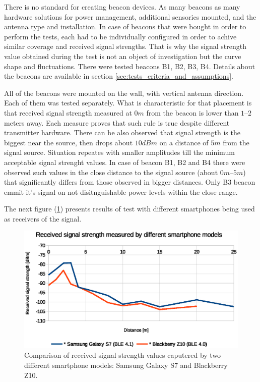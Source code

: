\documentclass[../main.tex]{subfiles}
\begin{document}
There is no standard for creating beacon devices. As many beacons as many hardware solutions for power management, additional sensorics mounted, and the antenna type and installation. In case of beacons that were bought in order to perform the tests, each had to be individually configured in order to achive similar coverage and received signal strengths. That is why the signal strength value obtained during the test is not an object of investigation but the curve shape and fluctuations. There were tested beacons B1, B2, B3, B4. Details about the beacons are available in section \ref{sec:tests_criteria_and_assumptions}.

All of the beacons were mounted on the wall, with vertical antenna direction. Each of them was tested separately. What is characteristic for that placement is that received signal strength measured at $0 m$ from the beacon is lower than $1$--$2$ meters away. Each measure proves that such rule is true despite different transmitter hardware. There can be also observed that signal strength is the biggest near the source, then drops about $10dBm$ on a distance of $5m$ from the signal source. Situation repeates with smaller amplitudes till the minimum acceptable signal strenght values. In case of beacon B1, B2 and B4 there were observed such values in the close distance to the signal source (about $0m$--$5m$) that significantly differs from those observed in bigger distances. Only B3 beacon emmit it's signal on not disitnguishable power levels within the close range.

The next figure (\ref{fig:tests_case9_smartphone_comparison}) presents results of test with different smartphones being used as receivers of the signal.

\begin{figure}[!htbp]
\includegraphics[width=\textwidth, keepaspectratio]{pictures/tests_case9_smartphone_comparison}
\centering
\caption{Comparison of received signal strength values caputered by two different smartphone models: Samsung Galaxy S7 and Blackberry Z10.}
\label{fig:tests_case9_smartphone_comparison}
\end{figure}
\end{document}
